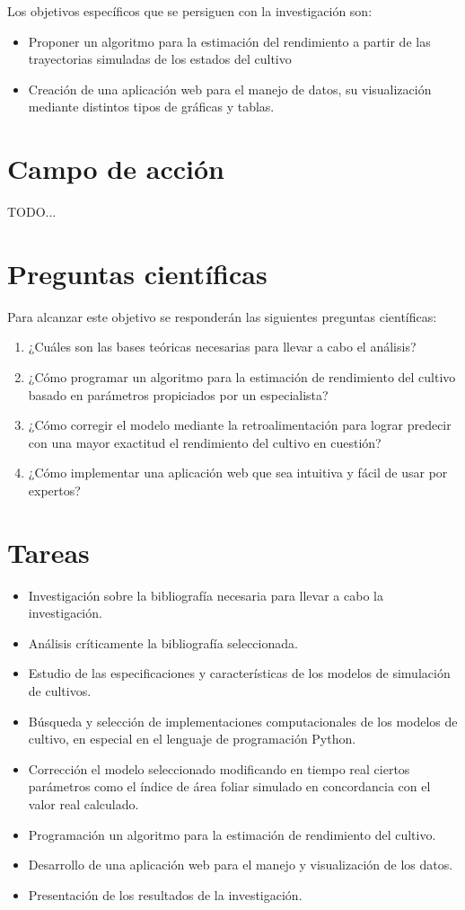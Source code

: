 Los objetivos específicos que se persiguen con la investigación son:

\begin{itemize}
	\item Proponer un algoritmo para la estimación del rendimiento a partir de las trayectorias simuladas de los estados del cultivo
	\item Creación de una aplicación web para el manejo de datos, su visualización mediante distintos tipos de gráficas y tablas.
\end{itemize}

\section*{Campo de acción}
TODO...



\section*{Preguntas científicas}
Para alcanzar este objetivo se responderán las siguientes preguntas científicas:

\begin{enumerate}
	\item ¿Cuáles son las bases teóricas necesarias para llevar a cabo el análisis?
	\item ¿Cómo programar un algoritmo para la estimación de rendimiento del cultivo basado en parámetros propiciados por un especialista?
	\item ¿Cómo corregir el modelo mediante la retroalimentación para lograr predecir con una mayor exactitud el rendimiento del cultivo en cuestión?
	\item ¿Cómo implementar una aplicación web que sea intuitiva y fácil de usar por expertos?
\end{enumerate}

\section*{Tareas}
\begin{itemize}
	\item Investigación sobre la bibliografía necesaria para llevar a cabo la investigación.
	\item Análisis críticamente la bibliografía seleccionada.
	\item Estudio de las especificaciones y características de los modelos de simulación de cultivos.
	\item Búsqueda y selección de implementaciones computacionales de los modelos de cultivo, en especial en el lenguaje de programación Python.
	\item Corrección el modelo seleccionado modificando en tiempo real ciertos parámetros como el índice de área foliar simulado en concordancia con el valor real calculado. 
	\item Programación un algoritmo para la estimación de rendimiento del cultivo.
	\item Desarrollo de una aplicación web para el manejo y visualización de los datos.
	\item Presentación de los resultados de la investigación.
\end{itemize}

